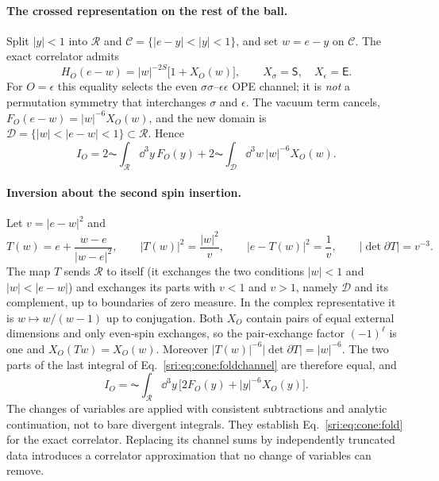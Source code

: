\paragraph{The crossed representation on the rest of the ball.} Split $|y|<1$ into $\mathcal R$ and
$\mathcal C=\{|e-y|<|y|<1\}$, and set $w=e-y$ on $\mathcal C$. The exact correlator admits
\begin{equation}
 H_O(e-w)=|w|^{-2S}\bigl[1+X_O(w)\bigr],\qquad X_\sigma=\mathsf S,\quad X_\epsilon=\mathsf E .
\end{equation}
For $O=\epsilon$ this equality selects the even $\sigma\sigma$--$\epsilon\epsilon$ OPE channel; it is \emph{not} a
permutation symmetry that interchanges $\sigma$ and $\epsilon$. The vacuum term cancels, $F_O(e-w)=|w|^{-6}X_O(w)$, and
the new domain is $\mathcal D=\{|w|<|e-w|<1\}\subset\mathcal R$. Hence
\begin{equation}
 I_O=2\AC\!\int_{\mathcal R}\dd^3y\,F_O(y)+2\AC\!\int_{\mathcal D}\dd^3w\,|w|^{-6}X_O(w).
 \label{sri:eq:cone:foldchannel}
\end{equation}

\paragraph{Inversion about the second spin insertion.} Let $v=|e-w|^2$ and
\begin{equation}
 T(w)=e+\frac{w-e}{|w-e|^2},\qquad |T(w)|^2=\frac{|w|^2}{v},\qquad |e-T(w)|^2=\frac1v,\qquad
 |\det\partial T|=v^{-3}.
\end{equation}
The map $T$ sends $\mathcal R$ to itself (it exchanges the two conditions $|w|<1$ and $|w|<|e-w|$) and exchanges its
parts with $v<1$ and $v>1$, namely $\mathcal D$ and its complement, up to boundaries of zero measure. In the complex
representative it is $w\mapsto w/(w-1)$ up to conjugation. Both $X_O$ contain pairs of equal external dimensions and
only even-spin exchanges, so the pair-exchange factor $(-1)^\ell$ is one and $X_O(Tw)=X_O(w)$. Moreover
$|T(w)|^{-6}|\det\partial T|=|w|^{-6}$. The two parts of the last integral of Eq.~\eqref{sri:eq:cone:foldchannel} are
therefore equal, and
\begin{equation}
 \boxed{\,I_O=\AC\!\int_{\mathcal R}\dd^3y\,\bigl[2F_O(y)+|y|^{-6}X_O(y)\bigr].\,}
 \label{sri:eq:cone:fold}
\end{equation}
The changes of variables are applied with consistent subtractions and analytic continuation, not to bare divergent
integrals. They establish Eq.~\eqref{sri:eq:cone:fold} for the exact correlator. Replacing its channel sums by
independently truncated data introduces a correlator approximation that no change of variables can remove.

